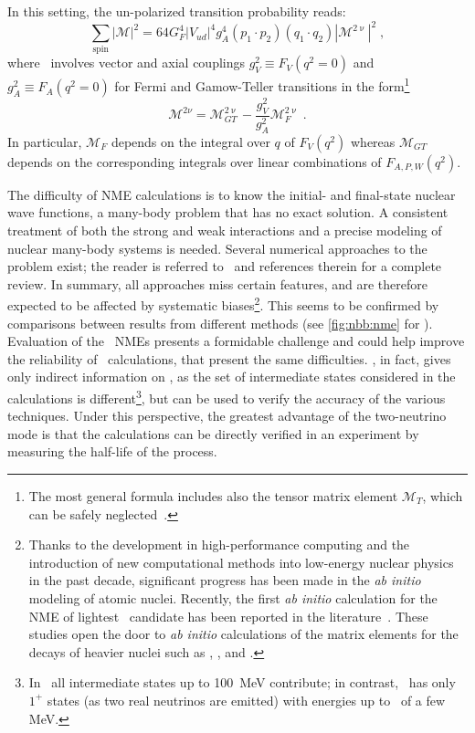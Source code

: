 In this setting, the un-polarized transition probability reads:
\begin{equation}\label{eq:nbb:trans-prob}
  \sum_\text{spin} |\mathcal{M}|^2 = 64 G^4_F |V_{ud}|^4 g^4_A (p_1 \cdot p_2)
                                     (q_1 \cdot q_2) |\mathcal{M}^{2\upnu}|^2 \;,
\end{equation}
where \nmet\ involves vector and axial couplings $g^2_V \equiv F_V(q^2=0)$ and $g^2_A
\equiv F_A(q^2=0)$ for Fermi and Gamow-Teller transitions in the form\footnote{%
  The most general formula includes also the tensor matrix element $\mathcal{M}_T$, which
  can be safely neglected~\cite{?}.
}
\[
  \mathcal{M}^{2\nu} = \mathcal{M}^{2\upnu}_{GT} -
                       \frac{g^2_V}{g^2_A} \mathcal{M}^{2\upnu}_F \;.
\]
In particular, $\mathcal{M}_F$ depends on the integral over $q$ of $F_V(q^2)$ whereas
$\mathcal{M}_{GT}$ depends on the corresponding integrals over linear combinations of
$F_{A,P,W}(q^2)$.

The difficulty of NME calculations is to know the initial- and final-state nuclear wave
functions, a many-body problem that has no exact solution. A consistent treatment of both the
strong and weak interactions and a precise modeling of nuclear many-body systems is
needed.
Several numerical approaches to
the problem exist; the reader is referred to~\cite{Engel2017} and references therein for a
complete review. In summary, all approaches miss certain features, and are therefore
expected to be affected by systematic biases\footnote{%
  Thanks to the development in high-performance computing and the introduction of new
  computational methods into low-energy nuclear physics in the past decade, significant
  progress has been made in the \emph{ab initio} modeling of atomic nuclei. Recently, the
  first \emph{ab initio} calculation for the NME of lightest \onbb\ candidate 
  has been reported in the literature~\cite{Yao2019}. These studies open the door to
  \emph{ab initio} calculations of the matrix elements for the decays of heavier nuclei
  such as \gesix, , and .
}. This seems to be confirmed by comparisons between results from different methods (see
\cref{fig:nbb:nme} for \onbb). Evaluation of the \nnbb\ NMEs presents a formidable
challenge and could help improve the reliability of \nmez\ calculations, that present the
same difficulties. \nnbb, in fact, gives only indirect information on \onbb, as the set of
intermediate states considered in the calculations is different\footnote{%
  In \onbb\ all intermediate states up to 100~MeV contribute; in contrast, \nnbb\ has only
  $1^+$ states (as two real neutrinos are emitted) with energies up to \qbb\ of a few MeV.
}, but can be used to verify the accuracy of the various techniques.  Under this
perspective, the greatest advantage of the two-neutrino mode is that the calculations can
be directly verified in an experiment by measuring the half-life of the process.

